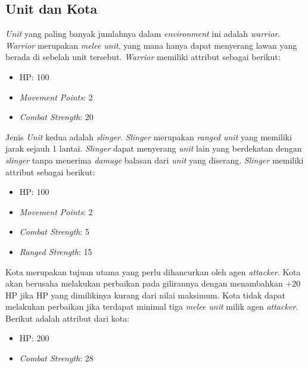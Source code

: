 \subsection{Unit dan Kota}
\emph{Unit} yang paling banyak jumlahnya dalam \emph{environment} ini adalah \emph{warrior}. 
\emph{Warrior} merupakan \emph{melee unit}, yang mana hanya dapat menyerang lawan yang berada di sebelah unit tersebut.
\emph{Warrior} memiliki attribut sebagai berikut:
\begin{itemize}
  \item HP: 100
  \item \emph{Movement Points}: 2
  \item \emph{Combat Strength}: 20
\end{itemize}

Jenis \emph{Unit} kedua adalah \emph{slinger}. \emph{Slinger} merupakan \emph{ranged unit} yang memiliki jarak sejauh 1 lantai.
\emph{Slinger} dapat menyerang \emph{unit} lain yang berdekatan dengan \emph{slinger} tanpa menerima \emph{damage} balasan dari \emph{unit} yang diserang.
\emph{Slinger} memiliki attribut sebagai berikut:
\begin{itemize}
  \item HP: 100
  \item \emph{Movement Points}: 2
  \item \emph{Combat Strength}: 5
  \item \emph{Ranged Strength}: 15
\end{itemize}

Kota merupakan tujuan utama yang perlu dihancurkan oleh agen \emph{attacker}. 
Kota akan berusaha melakukan perbaikan pada gilirannya dengan menambahkan +20 HP jika HP yang dimilikinya kurang dari nilai maksimum.
Kota tidak dapat melakukan perbaikan jika terdapat minimal tiga \emph{melee unit} milik agen \emph{attacker}.
Berikut adalah attribut dari kota:
\begin{itemize}
  \item HP: 200
  \item \emph{Combat Strength}: 28
\end{itemize}

